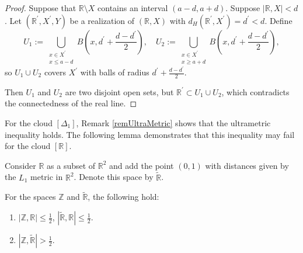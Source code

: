 \begin{proof}
  Suppose that
  $\mathbb{R} \setminus X$ contains an interval $(a-d, a+d)$. Suppose
  $|\mathbb{R}, X|<d$. Let $(\mathbb{R}^{\prime}, X^{\prime}, Y)$ be
  a realization of $(\mathbb{R}, X)$ with $d_H(\mathbb{R}^{\prime},
  X^{\prime}) = d^{\prime}<d$. Define
  $$
  U_1 := \bigcup_{\substack{x \in X^{\prime} \\ x \leq a-d}}
  B\left(x, d^{\prime}+\frac{d-d^{\prime}}{2}\right), \quad
  U_2 := \bigcup_{\substack{x \in X^{\prime} \\ x \geq a+d}}
  B\left(x, d^{\prime}+\frac{d-d^{\prime}}{2}\right),
  $$
  so $U_1 \cup U_2$ covers $X^{\prime}$ with balls of radius
  $d^\prime + \frac{d-d^{\prime}}{2}$.

  Then $U_1$ and $U_2$ are two disjoint open sets, but
  $\mathbb{R}^{\prime} \subset U_1 \cup U_2$, which contradicts the
  connectedness of the real line.
\end{proof}

For the cloud $[\Delta_{1}]$, Remark \ref{remUltraMetric} shows that
the ultrametric inequality holds. The following lemma demonstrates
that this inequality may fail for the cloud $[\mathbb{R}]$.

Consider $\mathbb{R}$ as a subset of $\mathbb{R}^2$ and add the point
$(0,1)$ with distances given by the $L_1$ metric in $\mathbb{R}^2$.
Denote this space by $\widetilde{\mathbb{R}}$.

\begin{theorem}\label{thrmRUltraMetric}
  For the spaces $\mathbb{Z}$ and $\widetilde{\mathbb{R}}$, the
  following hold:
  \begin{enumerate}
    \item $|\mathbb{Z}, \mathbb{R}| \le \frac{1}{2}$,
      $|\widetilde{\mathbb{R}}, \mathbb{R}| \le
      \frac{1}{2}$.\label{thrmPt:1}
    \item $|\mathbb{Z}, \widetilde{\mathbb{R}}|>
      \frac{1}{2}$.\label{thrmPt:2}
  \end{enumerate}
\end{theorem}

